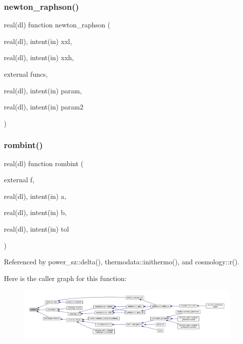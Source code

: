 \subsubsection{\texorpdfstring{newton\+\_\+raphson()}{newton\_raphson()}}
{\footnotesize\ttfamily real(dl) function newton\+\_\+raphson (\begin{DoxyParamCaption}\item[{real(dl), intent(in)}]{xxl,  }\item[{real(dl), intent(in)}]{xxh,  }\item[{external}]{funcs,  }\item[{real(dl), intent(in)}]{param,  }\item[{real(dl), intent(in)}]{param2 }\end{DoxyParamCaption})}

\mbox{\label{subroutines_8f90_ae1c8377d1cc1f765f031ecc37070dc7a}} 
\subsubsection{\texorpdfstring{rombint()}{rombint()}}
{\footnotesize\ttfamily real(dl) function rombint (\begin{DoxyParamCaption}\item[{external}]{f,  }\item[{real(dl), intent(in)}]{a,  }\item[{real(dl), intent(in)}]{b,  }\item[{real(dl), intent(in)}]{tol }\end{DoxyParamCaption})}



Referenced by power\+\_\+sz\+::delta(), thermodata\+::inithermo(), and cosmology\+::r().

Here is the caller graph for this function\+:
\nopagebreak
\begin{figure}[H]
\begin{center}
\leavevmode
\includegraphics[width=350pt]{subroutines_8f90_ae1c8377d1cc1f765f031ecc37070dc7a_icgraph}
\end{center}
\end{figure}
\mbox{\label{subroutines_8f90_a9b3be772ea91c10f9c682519e5e8bf1d}} 
